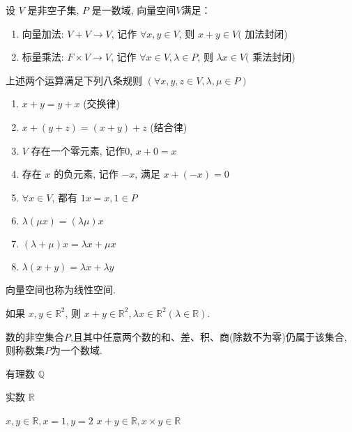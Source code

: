 \begin{definition}[向量空间$V$]
    设 \( V \) 是非空子集, \( P \) 是一数域, 向量空间$V$满足：

    \begin{enumerate}
        \item 向量加法: \( V+V \rightarrow V \), 记作 \( \forall x, y \in V \), 则 \( x+y \in V( \) 加法封闭)
        \item 标量乘法: \( F \times V \rightarrow V \), 记作 \( \forall x \in V, \lambda \in P \), 则 \( \lambda x \in V( \) 乘法封闭)
    \end{enumerate}

上述两个运算满足下列八条规则 \( (\forall x, y, z \in V, \lambda, \mu \in P) \) 
\begin{enumerate}
    \item \( x+y=y+x \) (交换律) 
    \item \( x+(y+z)=(x+y)+z \) (结合律)
    \item \( V \) 存在一个零元素, 记作0, \( x+0=x \)
    \item 存在 \( x \) 的负元素, 记作 \( -x \), 满足 \( x+(-x)=0 \)
    \item \( \forall x \in V \), 都有 \( 1 x=x, 1 \in P \)
    \item \( \lambda(\mu x)=(\lambda \mu) x \)
    \item \( (\lambda+\mu) x=\lambda x+\mu x \)
    \item \(  \lambda(x+y)=\lambda x+\lambda y \)
\end{enumerate}
\end{definition}

\begin{corollary}
    向量空间也称为线性空间.
\end{corollary}

\begin{corollary}
    如果 \( x, y \in \mathbb{R}^{2} \), 则 \( x+y \in \mathbb{R}^{2}, \lambda x \in \mathbb{R}^{2}(\lambda \in \mathbb{R}) \).
\end{corollary}

\begin{definition}[数域]
    数的非空集合$P$,且其中任意两个数的和、差、积、商(除数不为零)仍属于该集合, 则称数集$P$为一个数域. 
\end{definition}

\begin{example}
    有理数 $ \mathbb{Q} $
\end{example}

\begin{example}
    实数 $ \mathbb{R} $

    $ x, y \in \mathbb{R}, x=1, y=2 $
    $ x+y \in \mathbb{R}  ,x \times y \in \mathbb{R} $
\end{example}

